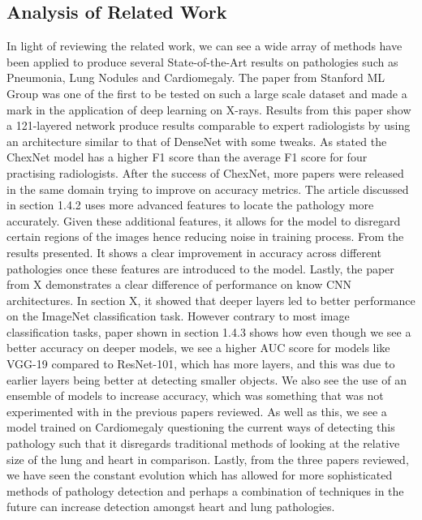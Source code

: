 \subsection{Analysis of Related Work}

In light of reviewing the related work, we can see a wide array of methods have been applied to produce several State-of-the-Art results on pathologies such as Pneumonia, Lung Nodules and Cardiomegaly.
The paper from Stanford ML Group was one of the first to be tested on such a large scale dataset and made a mark in the application of deep learning on X-rays. Results from this paper show a 121-layered network produce results comparable to expert radiologists by using an architecture similar to that of DenseNet with some tweaks. As stated the ChexNet model has a higher F1 score than the average F1 score for four practising radiologists. 
After the success of ChexNet, more papers were released in the same domain trying to improve on accuracy metrics. The article discussed in section 1.4.2 uses more advanced features to locate the pathology more accurately. Given these additional features, it allows for the model to disregard certain regions of the images hence reducing noise in training process. From the results presented. It shows a clear improvement in accuracy across different pathologies once these features are introduced to the model. 
Lastly, the paper from X demonstrates a clear difference of performance on know CNN architectures. In section X, it showed that deeper layers led to better performance on the ImageNet classification task. However contrary to most image classification tasks, paper shown in section 1.4.3 shows how even though we see a better accuracy on deeper models, we see a higher AUC score for models like VGG-19 compared to ResNet-101, which has more layers, and this was due to earlier layers being better at detecting smaller objects. We also see the use of an ensemble of models to increase accuracy, which was something that was not experimented with in the previous papers reviewed. As well as this, we see a model trained on Cardiomegaly questioning the current ways of detecting this pathology such that it disregards traditional methods of looking at the relative size of the lung and heart in comparison. 
Lastly, from the three papers reviewed, we have seen the constant evolution which has allowed for more sophisticated methods of pathology detection and perhaps a combination of techniques in the future can increase detection amongst heart and lung pathologies. 




